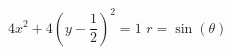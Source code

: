 { $4x^2 + 4\left( y - \dfrac{1}{2} \right)^2 = 1$ \label{equrecttopolarlast}}
{ $r = \sin(\theta)$}
